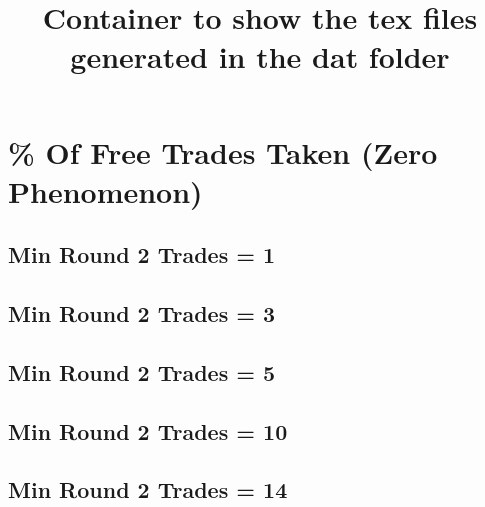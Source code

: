 \documentclass[onecolumn,10pt]{article}
\title{Container to show the tex files generated in the dat folder}
\author{}
\begin{document}
\newcommand{\todo}[1]{\textsf{\color{todocolor} #1}}

\maketitle

\section{\% Of Free Trades Taken (Zero Phenomenon)}

\subsection{Min Round 2 Trades = 1}


\subsection{Min Round 2 Trades = 3}


\subsection{Min Round 2 Trades = 5}


\subsection{Min Round 2 Trades = 10}


\subsection{Min Round 2 Trades = 14}

\end{document}

